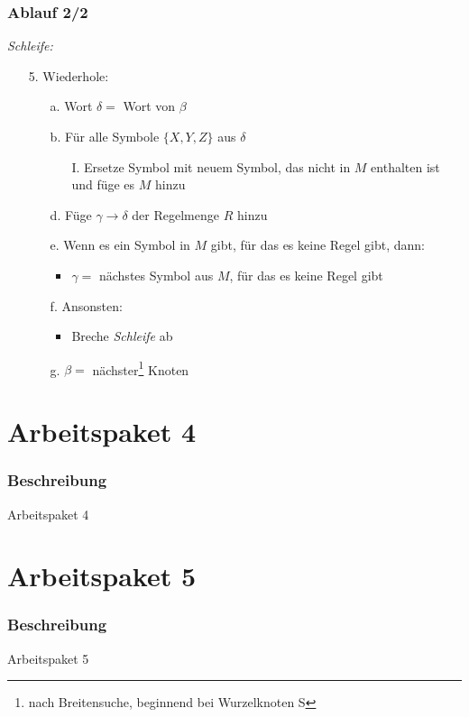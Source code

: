 \documentclass[12pt]{beamer}
\begin{document}
    \begin{frame}
        \frametitle{Ablauf 2/2}
        \textit{Schleife:}
        \begin{itemize}
            \item[5.] Wiederhole:
            \begin{itemize}
                \item[a.] Wort $\delta=$ Wort von $\beta$
                \item[b.] Für alle Symbole $\{X,Y,Z\}$ aus $\delta$
                \begin{itemize}
                    \item[I.] Ersetze Symbol mit neuem Symbol, das nicht in $M$ enthalten ist und füge es $M$ hinzu
                \end{itemize}
                \item[d.] Füge $\gamma\rightarrow\delta$ der Regelmenge $R$ hinzu
                \item[e.] Wenn es ein Symbol in $M$ gibt, für das es keine Regel gibt, dann:
                \begin{itemize}
                    \item $\gamma=$ nächstes Symbol aus $M$, für das es keine Regel gibt
                \end{itemize}
                \item[f.] Ansonsten:
                \begin{itemize}
                    \item Breche \textit{Schleife} ab
                \end{itemize}
                \item[g.] $\beta=$ nächster\footnote{nach Breitensuche, beginnend bei Wurzelknoten S} Knoten
            \end{itemize}
        \end{itemize}
    \end{frame}

    \section{Arbeitspaket 4}
    \label{sec:4}

    \begin{frame}
        \frametitle{Beschreibung}
        Arbeitspaket 4
    \end{frame}

    \section{Arbeitspaket 5}
    \label{sec:5}

    \begin{frame}
        \frametitle{Beschreibung}
        Arbeitspaket 5
    \end{frame}
\end{document}
